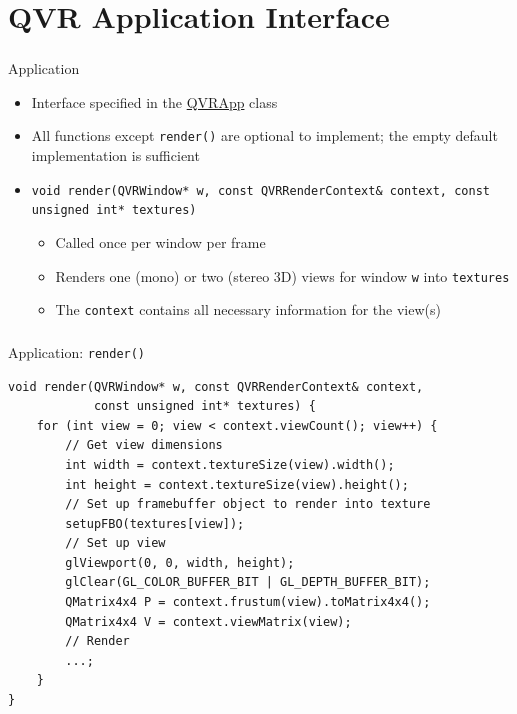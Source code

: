 \documentclass[utf8,stillsansserifmath,fleqn,t]{beamer}
\newcommand{\code}[1]{\texttt{#1}}
\begin{document}
\section{QVR Application Interface}

\begin{frame}
\frametitle{\insertsection}
Application
\begin{itemize}
\item Interface specified in the \href{https://marlam.de/qvr/libqvr-reference/class_q_v_r_app.html}{QVRApp} class
\item All functions except \code{render()} are optional to implement; the empty
default implementation is sufficient
\item \code{void render(QVRWindow* w, const QVRRenderContext\& context, const
unsigned int* textures)}
    \begin{itemize}
    \item Called once per window per frame
    \item Renders one (mono) or two (stereo 3D) views for window \code{w} into
    \code{textures}
    \item The \code{context} contains all necessary information for the view(s)
    \end{itemize}
\end{itemize}
\end{frame}

\begin{frame}[fragile]
\frametitle{\insertsection}
Application: \code{render()}
\begin{lstlisting}
void render(QVRWindow* w, const QVRRenderContext& context,
            const unsigned int* textures) {
    for (int view = 0; view < context.viewCount(); view++) {
        // Get view dimensions
        int width = context.textureSize(view).width();
        int height = context.textureSize(view).height();
        // Set up framebuffer object to render into texture
        setupFBO(textures[view]);
        // Set up view
        glViewport(0, 0, width, height);
        glClear(GL_COLOR_BUFFER_BIT | GL_DEPTH_BUFFER_BIT);
        QMatrix4x4 P = context.frustum(view).toMatrix4x4();
        QMatrix4x4 V = context.viewMatrix(view);
        // Render
        ...;
    }
}
\end{lstlisting}
\end{frame}
\end{document}
